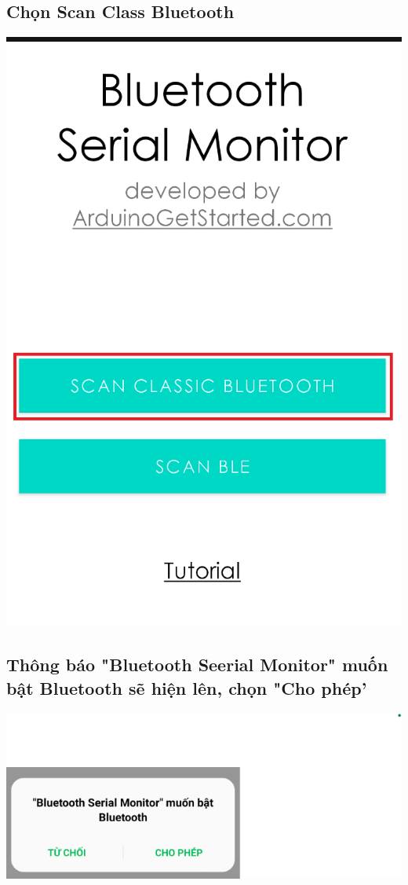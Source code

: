 \documentclass[conference]{IEEEtran}
\begin{document}
\subsection{Chọn Scan Class Bluetooth}\label{SCM}
    \centering
    \includegraphics[width=0.7\linewidth]{1.png}
    \label{fig:enter-label}
\subsection{Thông báo "Bluetooth Seerial Monitor" muốn bật Bluetooth sẽ hiện lên, chọn "Cho phép'}\label{SCM}
    \centering
    \includegraphics[width=1.5\linewidth]{2.png}
    \label{fig:enter-label}
\end{document}
